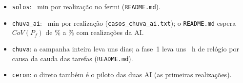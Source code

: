 \documentclass[11pt,a4paper]{article}
\begin{document}
\begin{itemize}
\item \texttt{solos}: \SolosMinReal~min por realização no fermi (\texttt{README.md}).
\item \texttt{chuva\_ai}: \ChuvaAIMin~min por realização (\texttt{casos\_chuva\_ai.txt}); o \texttt{README.md} espera
$CoV(P_f)$ de \ChuvaAICovLin\% a \ChuvaAICovMax\% com \ChuvaAIN{} realizações da AI.
\item \texttt{chuva}: a campanha inteira leva uns \ChuvaTotalDias{} dias; a fase~1 leva uns \ChuvaRelogioFaseUmReadme~h
de relógio por causa da cauda das tarefas (\texttt{README.md}).
\item \texttt{ceron}: o direto também é o piloto das duas AI (as \CeronPiloto{} primeiras realizações).
\end{itemize}
\end{document}
